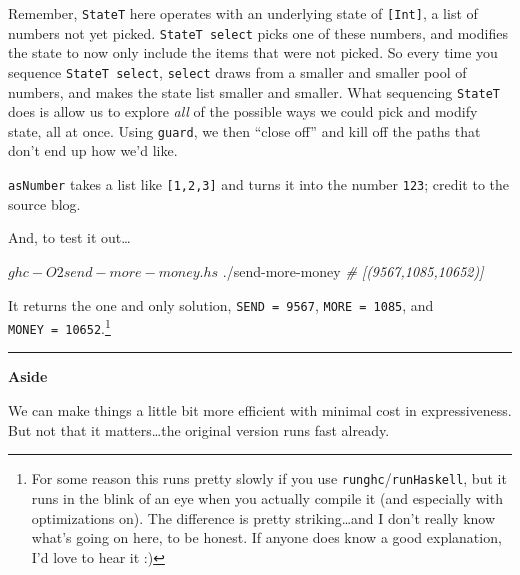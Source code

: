 \documentclass[]{article}
\newenvironment{Shaded}{}{}
\newcommand{\CommentTok}[1]{\textcolor[rgb]{0.38,0.63,0.69}{\textit{#1}}}
\newcommand{\ExtensionTok}[1]{#1}
\newcommand{\NormalTok}[1]{#1}
\begin{document}
Remember, \texttt{StateT} here operates with an underlying state of
\texttt{{[}Int{]}}, a list of numbers not yet picked. \texttt{StateT\ select}
picks one of these numbers, and modifies the state to now only include the items
that were not picked. So every time you sequence \texttt{StateT\ select},
\texttt{select} draws from a smaller and smaller pool of numbers, and makes the
state list smaller and smaller. What sequencing \texttt{StateT} does is allow us
to explore \emph{all} of the possible ways we could pick and modify state, all
at once. Using \texttt{guard}, we then ``close off'' and kill off the paths that
don't end up how we'd like.

\texttt{asNumber} takes a list like \texttt{{[}1,2,3{]}} and turns it into the
number \texttt{123}; credit to the source blog.

And, to test it out\ldots{}

\begin{Shaded}
\begin{Highlighting}[]
\NormalTok{$ }\ExtensionTok{ghc}\NormalTok{ -O2 send-more-money.hs}
\NormalTok{$ }\ExtensionTok{./send-more-money}
\CommentTok{# [(9567,1085,10652)]}
\end{Highlighting}
\end{Shaded}

It returns the one and only solution, \texttt{SEND\ =\ 9567},
\texttt{MORE\ =\ 1085}, and \texttt{MONEY\ =\ 10652}.\footnote{For some reason
  this runs pretty slowly if you use \texttt{runghc}/\texttt{runHaskell}, but it
  runs in the blink of an eye when you actually compile it (and especially with
  optimizations on). The difference is pretty striking\ldots{}and I don't really
  know what's going on here, to be honest. If anyone does know a good
  explanation, I'd love to hear it :)}

\begin{center}\rule{0.5\linewidth}{\linethickness}\end{center}

\textbf{Aside}

We can make things a little bit more efficient with minimal cost in
expressiveness. But not that it matters\ldots{}the original version runs fast
already.
\end{document}

